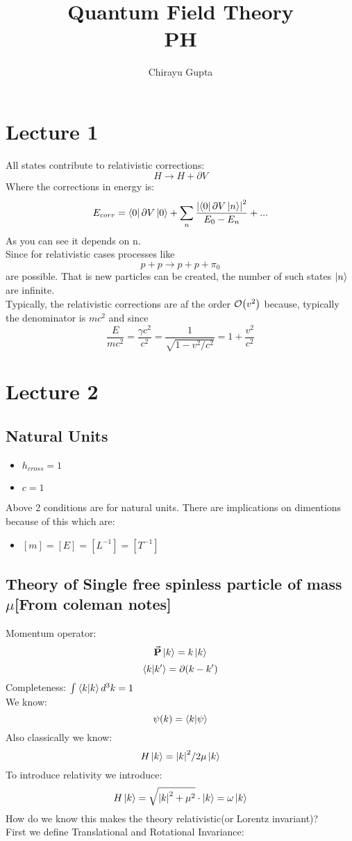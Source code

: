 \documentclass{scrartcl}
\title{ Quantum Field Theory \\ \large{ PH } }
\author{Chirayu Gupta}
\date{}
\begin{document}
\maketitle
\section{Lecture 1}
All states contribute to relativistic corrections:
\[ H \rightarrow H + \partial V \]
Where the corrections in energy is: 
\[ E_{corr} = \bra{0} \partial V \ket{0} + \sum_n\displaystyle\frac{\abs{\bra{0}\partial V \ket{n}}^2}{E_0 - E_n}  + ... \]
As you can see it depends on n.\\
Since for relativistic cases processes like 
\[ p + p \rightarrow p + p + \pi_0 \] are possible. That is new particles can be created,
the number of such states \( \ket{n} \) are infinite.\\
Typically, the relativistic corrections are af the order \( \order{v^2} \) because, typically the denominator
is \( mc^2 \) and since \[ \displaystyle\frac{E}{mc^2} = \displaystyle\frac{\gamma c^2}{c^2} = \displaystyle\frac{1}{\sqrt{1-v^2/c^2}} = 1+ \displaystyle\frac{v^2}{c^2} \]
\section{Lecture 2}
\subsection{Natural Units}
\begin{itemize}
	\item \( h_{cross} = 1 \)
	\item \( c = 1 \)
\end{itemize}
Above 2 conditions are for natural units.
There are implications on dimentions because of this which are:
\begin{itemize}
	\item \( [m] = [E] = [L^{-1}] = [T^{-1}]  \)
\end{itemize}
\subsection{Theory of Single free spinless particle of mass \( \mu \)[From coleman notes]}
Momentum operator:
\[ \va{P} \ket{k} = k \ket{k} \]
\[ \bra{k} \ket{k'} = \partial (k-k') \]
Completeness:
\( \int_{}^{} \bra{k} \ket{k} d^3 k = 1 \)\\
We know:
\[ \psi(k) = \bra{k}\ket{\psi} \]
Also classically we know:
\[ H \ket{k} = \abs{k}^2 / 2 \mu \ket{k} \]
To introduce relativity we introduce:
\[ H \ket{k} = \sqrt{\abs{k}^2  + \mu^2} \cdot \ket{k} = \omega \ket{k} \]
How do we know this makes the theory relativistic(or Lorentz invariant)?\\
First we define Translational and Rotational Invariance:
\end{document}
